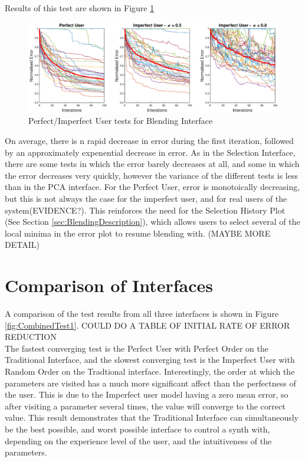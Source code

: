 \documentclass[11pt, oneside]{report}   	%
\begin{document}
Results of this test are shown in Figure \ref{fig:BlendingTest1}
\begin{figure}
	\hspace{-70pt}
	\includegraphics[width = 8in]{BlendingInterfaceTests1.eps}
	\caption{Perfect/Imperfect User tests for Blending Interface}
	\label{fig:BlendingTest1}
\end{figure}
On average, there is n rapid decrease in error during the first iteration, followed by an approximately expenential decrease in error.
As in the Selection Interface, there are some tests in which the error barely decreases at all, and some in which the error decreases very quickly, however the variance of the different tests is less than in the PCA interface. For the Perfect User, error is monotoically decreasing, but this is not always the case for the imperfect user, and for real users of the system(EVIDENCE?). This reinforces the need for the Selection History Plot (See Section \ref{sec:BlendingDescription}), which allows users to select several of the local minima in the error plot to resume blending with. (MAYBE MORE DETAIL)

\section{Comparison of Interfaces}
A comparison of the test results from all three interfaces is shown in Figure \ref{fig:CombinedTest1}.  COULD DO A TABLE OF INITIAL RATE OF ERROR REDUCTION
\\
The fastest converging test is the Perfect User with Perfect Order on the Traditional Interface, and the slowest converging test is the Imperfect User with Random Order on the Tradtional interface. Interestingly, the order at which the parameters are visited has a much more significant affect than the perfectness of the user. This is due to the Imperfect user model having a zero mean error, so after visiting a parameter several times, the value will converge to the correct value. This result demonstrates that the Traditional Interface can simultaneously be the best possible, and worst possible interface to control a synth with, depending on the experience level of the user, and the intuitiveness of the parameters.
\end{document}
